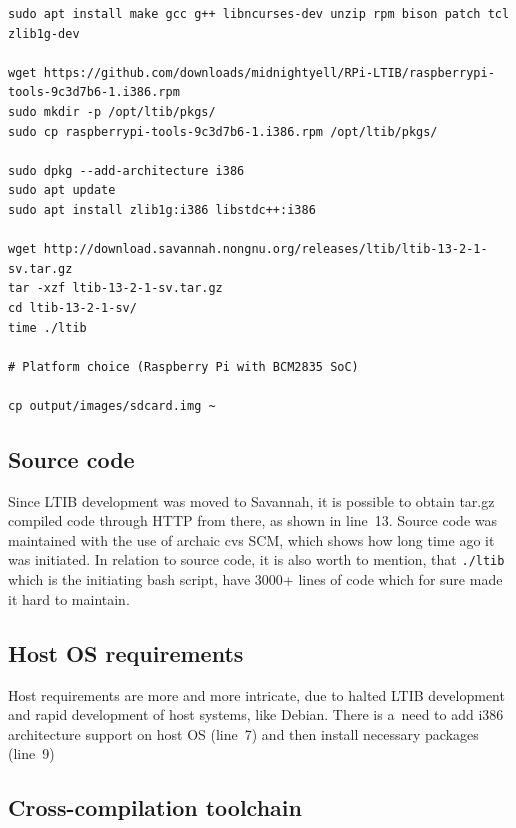 \documentclass[printmode]{mgr}
\begin{document}

\begin{lstlisting}
sudo apt install make gcc g++ libncurses-dev unzip rpm bison patch tcl zlib1g-dev

wget https://github.com/downloads/midnightyell/RPi-LTIB/raspberrypi-tools-9c3d7b6-1.i386.rpm
sudo mkdir -p /opt/ltib/pkgs/
sudo cp raspberrypi-tools-9c3d7b6-1.i386.rpm /opt/ltib/pkgs/

sudo dpkg --add-architecture i386
sudo apt update
sudo apt install zlib1g:i386 libstdc++:i386

wget http://download.savannah.nongnu.org/releases/ltib/ltib-13-2-1-sv.tar.gz
tar -xzf ltib-13-2-1-sv.tar.gz
cd ltib-13-2-1-sv/
time ./ltib

# Platform choice (Raspberry Pi with BCM2835 SoC)

cp output/images/sdcard.img ~
\end{lstlisting}




\subsection*{Source code}

Since LTIB development was moved to Savannah, it is possible to obtain tar.gz compiled code through HTTP from there, as shown in line~13.
Source code was maintained with the use of archaic cvs SCM, which shows how long time ago it was initiated.
In relation to source code, it is also worth to mention, that \verb|./ltib| which is the initiating bash script, have 3000+ lines of code which for sure made it hard to maintain. 

\subsection*{Host OS requirements}

Host requirements are more and more intricate, due to halted LTIB development and rapid development of host systems, like Debian.
There is a~need to add i386 architecture support on host OS (line~7) and then install necessary packages (line~9)

\subsection*{Cross-compilation toolchain}
\end{document}
